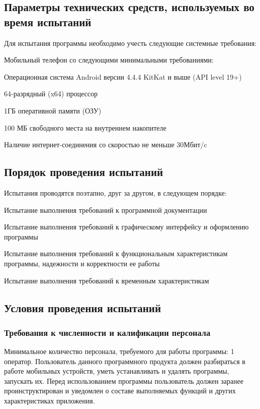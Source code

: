 \subsection{Параметры технических средств, используемых во время испытаний}
Для испытания программы необходимо учесть следующие системные требования:
\begin{my_enumerate}
    \item Мобильный телефон со следующими минимальными требованиями:
    \begin{my_enumerate}
        \item Операционная система Android версии 4.4.4 KitKat и выше (API level 19+)
        \item 64-разрядный (x64) процессор
        \item 1ГБ оперативной памяти (ОЗУ)
        \item 100 МБ свободного места на внутреннем накопителе
    \end{my_enumerate}
    \item Наличие интернет-соединения со скоростью не меньше 30Мбит/c
\end{my_enumerate}


\subsection{Порядок проведения испытаний}
Испытания проводятся поэтапно, друг за другом, в следующем порядке:
\begin{my_enumerate}
    \item Испытание выполнения требований к программной документации
    \item Испытание выполнения требований к графическому интерфейсу и оформлению программы
    \item Испытание выполнения требований к функциональным характеристикам программы, надежности и корректности ее работы
    \item Испытание выполнения требований к временным характеристикам
\end{my_enumerate}


\subsection{Условия проведения испытаний}

\subsubsection{Требования к численности и калификации персонала}
Минимальное количество персонала, требуемого для работы программы: 1 оператор.
Пользователь данного программного продукта должен разбираться в работе
мобильных устройств, уметь устанавливать и удалять программы, запускать их.
Перед использованием программы пользователь должен заранее проинструктирован и
уведомлен о составе выполняемых функций и других характеристиках приложения.

